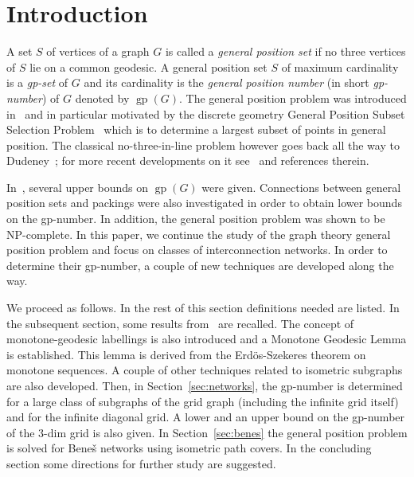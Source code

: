 \documentclass[12pt]{article}
\DeclareMathOperator {\gp} {gp}
\begin{document}
\medskip
{} 

\section{Introduction}
\label{sec:introduction}

A set $S$ of vertices of a graph $G$ is called a {\em general position set} if no three vertices of $S$ lie on a common geodesic. A general position set $S$ of maximum cardinality is a {\em gp-set} of $G$ and its cardinality is the {\em general position number} (in short {\em gp-number}) of $G$ denoted by $\gp(G)$. The general position problem was introduced in~\cite{MaKl-2017+} and in particular motivated by the discrete geometry General Position Subset Selection Problem~\cite{Froese-2017+, PaWo13} which is to determine a largest subset of points in general position. The classical no-three-in-line problem however goes back all the way to Dudeney~\cite{dudeney-1917}; for more recent developments on it see~\cite{misiak-2016, PoWo07} and references therein.

In~\cite{MaKl-2017+}, several upper bounds on $\gp(G)$ were given. Connections between general position sets and packings were also investigated in order to obtain lower bounds on the gp-number. In addition, the general position problem was shown to be NP-complete. In this paper, we continue the study of the graph theory general position problem and focus on classes of interconnection networks. In order to determine their gp-number, a couple of new techniques are developed along the way. 

We proceed as follows. In the rest of this section definitions needed are listed. In the subsequent section, some results from~\cite{MaKl-2017+} are recalled. The concept of monotone-geodesic labellings is also introduced and a Monotone Geodesic Lemma is established. This lemma is derived from the Erd\"os-Szekeres theorem on monotone sequences. A couple of other techniques related to isometric subgraphs are also developed. Then, in Section~\ref{sec:networks}, the gp-number is determined for a large class of subgraphs of the grid graph (including the infinite grid itself) and for the infinite diagonal grid. A lower and an upper bound on the gp-number of the 3-dim grid is also given. In Section~\ref{sec:benes} the general position problem is solved for Bene\v{s} networks using isometric path covers. In the concluding section some directions for further study are suggested.  
\end{document}
